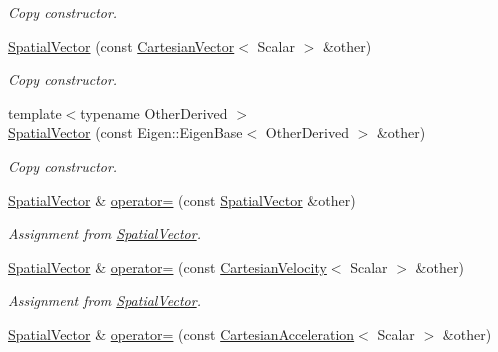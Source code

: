 \begin{DoxyCompactItemize}
\begin{DoxyCompactList}\small\item\em Copy constructor. \end{DoxyCompactList}\item 
\hyperlink{classow__core_1_1SpatialVector_a122ad5ecf5ff15e971bf4a45f30fffd6}{Spatial\+Vector} (const \hyperlink{classow__core_1_1CartesianVector}{Cartesian\+Vector}$<$ Scalar $>$ \&other)\hypertarget{classow__core_1_1SpatialVector_a122ad5ecf5ff15e971bf4a45f30fffd6}{}\label{classow__core_1_1SpatialVector_a122ad5ecf5ff15e971bf4a45f30fffd6}

\begin{DoxyCompactList}\small\item\em Copy constructor. \end{DoxyCompactList}\item 
{\footnotesize template$<$typename Other\+Derived $>$ }\\\hyperlink{classow__core_1_1SpatialVector_af5e4783d4e400a87a7767c4cfda2dd96}{Spatial\+Vector} (const Eigen\+::\+Eigen\+Base$<$ Other\+Derived $>$ \&other)
\begin{DoxyCompactList}\small\item\em Copy constructor. \end{DoxyCompactList}\item 
\hyperlink{classow__core_1_1SpatialVector}{Spatial\+Vector} \& \hyperlink{classow__core_1_1SpatialVector_a3aeb951a6dba348ddb72a70ebaff7cbd}{operator=} (const \hyperlink{classow__core_1_1SpatialVector}{Spatial\+Vector} \&other)\hypertarget{classow__core_1_1SpatialVector_a3aeb951a6dba348ddb72a70ebaff7cbd}{}\label{classow__core_1_1SpatialVector_a3aeb951a6dba348ddb72a70ebaff7cbd}

\begin{DoxyCompactList}\small\item\em Assignment from \hyperlink{classow__core_1_1SpatialVector}{Spatial\+Vector}. \end{DoxyCompactList}\item 
\hyperlink{classow__core_1_1SpatialVector}{Spatial\+Vector} \& \hyperlink{classow__core_1_1SpatialVector_a4819fd88ea9aeb7e32f65cd5039c6fa0}{operator=} (const \hyperlink{classow__core_1_1CartesianVelocity}{Cartesian\+Velocity}$<$ Scalar $>$ \&other)\hypertarget{classow__core_1_1SpatialVector_a4819fd88ea9aeb7e32f65cd5039c6fa0}{}\label{classow__core_1_1SpatialVector_a4819fd88ea9aeb7e32f65cd5039c6fa0}

\begin{DoxyCompactList}\small\item\em Assignment from \hyperlink{classow__core_1_1SpatialVector}{Spatial\+Vector}. \end{DoxyCompactList}\item 
\hyperlink{classow__core_1_1SpatialVector}{Spatial\+Vector} \& \hyperlink{classow__core_1_1SpatialVector_aefc0c3c5d18ae2b4605ee96443ca3154}{operator=} (const \hyperlink{classow__core_1_1CartesianAcceleration}{Cartesian\+Acceleration}$<$ Scalar $>$ \&other)\hypertarget{classow__core_1_1SpatialVector_aefc0c3c5d18ae2b4605ee96443ca3154}{}\label{classow__core_1_1SpatialVector_aefc0c3c5d18ae2b4605ee96443ca3154}


\end{DoxyCompactItemize}
